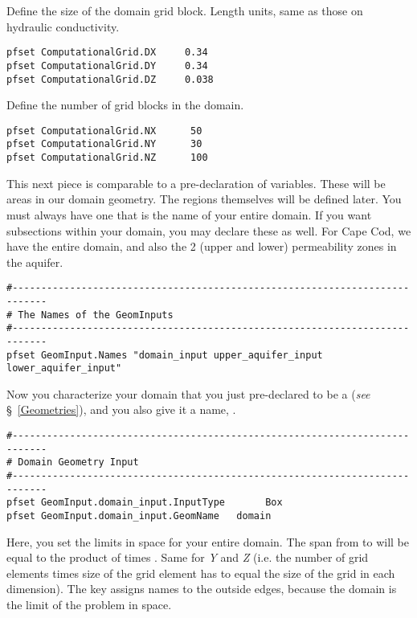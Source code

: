 Define the size of the domain grid block.  Length units, same as those on hydraulic conductivity.

\begin{verbatim}
pfset ComputationalGrid.DX     0.34
pfset ComputationalGrid.DY     0.34
pfset ComputationalGrid.DZ     0.038
\end{verbatim}

Define the number of grid blocks in the domain.

\begin{verbatim}
pfset ComputationalGrid.NX      50
pfset ComputationalGrid.NY      30
pfset ComputationalGrid.NZ      100
\end{verbatim}

This next piece is comparable to a pre-declaration of variables.  These will be areas in our domain geometry. 
The regions themselves will be defined later.  You must always have one that is the name of your entire domain.  
If you want subsections within your domain, you may declare these as well.  For Cape Cod, we have the entire domain,
and also the 2 (upper and lower) permeability zones in the aquifer.

\begin{verbatim}
#----------------------------------------------------------------------------
# The Names of the GeomInputs
#----------------------------------------------------------------------------
pfset GeomInput.Names "domain_input upper_aquifer_input lower_aquifer_input"
\end{verbatim}

Now you characterize your domain that you just pre-declared to be a  (\emph{see} \S~\ref{Geometries}),
and you also give it a name, .

\begin{verbatim}
#----------------------------------------------------------------------------
# Domain Geometry Input
#----------------------------------------------------------------------------
pfset GeomInput.domain_input.InputType       Box
pfset GeomInput.domain_input.GeomName   domain
\end{verbatim}

Here, you set the limits in space for your entire domain.  The span from  to  
will be equal to the product of  times .  
Same for {\em Y} and {\em Z} (i.e. the number of grid elements times size of the grid element has to
equal the size of the grid in each dimension).   The  key assigns names to the outside edges, 
because the domain is the limit of the problem in space.

